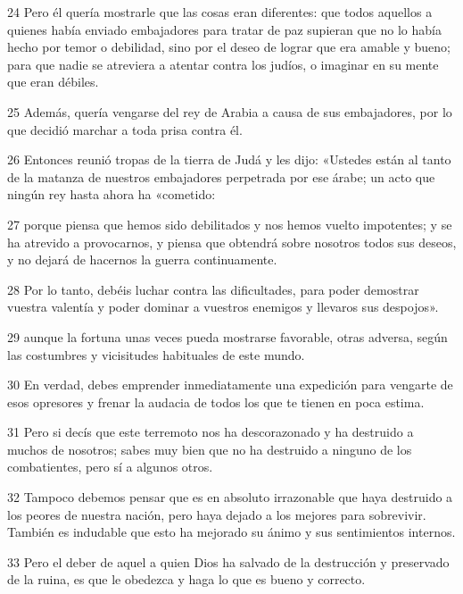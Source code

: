 \par 24 Pero él quería mostrarle que las cosas eran diferentes: que todos aquellos a quienes había enviado embajadores para tratar de paz supieran que no lo había hecho por temor o debilidad, sino por el deseo de lograr que era amable y bueno; para que nadie se atreviera a atentar contra los judíos, o imaginar en su mente que eran débiles.

\par 25 Además, quería vengarse del rey de Arabia a causa de sus embajadores, por lo que decidió marchar a toda prisa contra él.

\par 26 Entonces reunió tropas de la tierra de Judá y les dijo: «Ustedes están al tanto de la matanza de nuestros embajadores perpetrada por ese árabe; un acto que ningún rey hasta ahora ha «cometido:

\par 27 porque piensa que hemos sido debilitados y nos hemos vuelto impotentes; y se ha atrevido a provocarnos, y piensa que obtendrá sobre nosotros todos sus deseos, y no dejará de hacernos la guerra continuamente.

\par 28 Por lo tanto, debéis luchar contra las dificultades, para poder demostrar vuestra valentía y poder dominar a vuestros enemigos y llevaros sus despojos».

\par 29 aunque la fortuna unas veces pueda mostrarse favorable, otras adversa, según las costumbres y vicisitudes habituales de este mundo.

\par 30 En verdad, debes emprender inmediatamente una expedición para vengarte de esos opresores y frenar la audacia de todos los que te tienen en poca estima.

\par 31 Pero si decís que este terremoto nos ha descorazonado y ha destruido a muchos de nosotros; sabes muy bien que no ha destruido a ninguno de los combatientes, pero sí a algunos otros.

\par 32 Tampoco debemos pensar que es en absoluto irrazonable que haya destruido a los peores de nuestra nación, pero haya dejado a los mejores para sobrevivir. También es indudable que esto ha mejorado su ánimo y sus sentimientos internos.

\par 33 Pero el deber de aquel a quien Dios ha salvado de la destrucción y preservado de la ruina, es que le obedezca y haga lo que es bueno y correcto.

